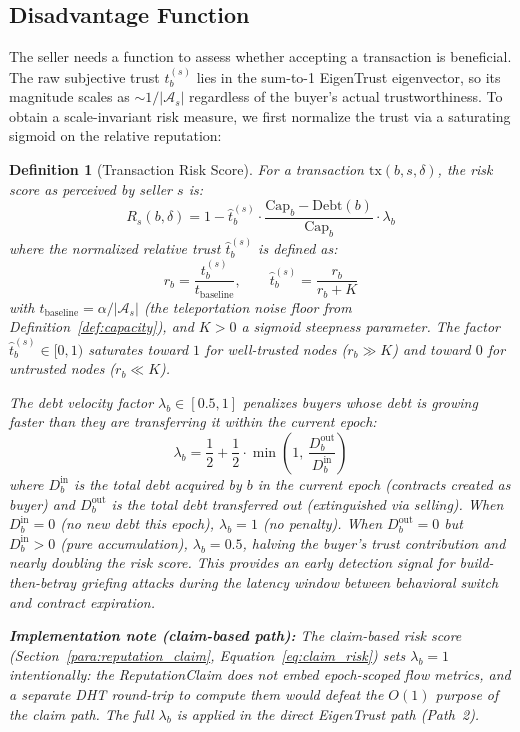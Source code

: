 \documentclass[11pt]{article}
\newtheorem{definition}[theorem]{Definition}
\begin{document}
\subsection{Disadvantage Function}

The seller needs a function to assess whether accepting a transaction is beneficial. The raw subjective trust $t^{(s)}_b$ lies in the sum-to-1 EigenTrust eigenvector, so its magnitude scales as $\sim 1/|\mathcal{A}_s|$ regardless of the buyer's actual trustworthiness. To obtain a scale-invariant risk measure, we first normalize the trust via a saturating sigmoid on the relative reputation:

\begin{definition}[Transaction Risk Score]\label{def:risk_score}
For a transaction $\text{tx}(b, s, \delta)$, the risk score as perceived by seller $s$ is:
\begin{equation}\label{eq:risk}
    R_s(b, \delta) = 1 - \hat{t}^{(s)}_b \cdot \frac{\text{Cap}_b - \text{Debt}(b)}{\text{Cap}_b} \cdot \lambda_b
\end{equation}
where the \emph{normalized relative trust} $\hat{t}^{(s)}_b$ is defined as:
\begin{equation}\label{eq:rel_trust}
    r_b = \frac{t^{(s)}_b}{t_{\text{baseline}}}, \qquad
    \hat{t}^{(s)}_b = \frac{r_b}{r_b + K}
\end{equation}
with $t_{\text{baseline}} = \alpha / |\mathcal{A}_s|$ (the teleportation noise floor from Definition~\ref{def:capacity}), and $K > 0$ a sigmoid steepness parameter. The factor $\hat{t}^{(s)}_b \in [0, 1)$ saturates toward $1$ for well-trusted nodes ($r_b \gg K$) and toward $0$ for untrusted nodes ($r_b \ll K$).

The \emph{debt velocity factor} $\lambda_b \in [0.5, 1]$ penalizes buyers whose debt is growing faster than they are transferring it within the current epoch:
\begin{equation}\label{eq:transfer_factor}
    \lambda_b = \frac{1}{2} + \frac{1}{2} \cdot \min\!\left(1,\, \frac{D^{\text{out}}_b}{D^{\text{in}}_b}\right)
\end{equation}
where $D^{\text{in}}_b$ is the total debt acquired by $b$ in the current epoch (contracts created as buyer) and $D^{\text{out}}_b$ is the total debt transferred out (extinguished via selling). When $D^{\text{in}}_b = 0$ (no new debt this epoch), $\lambda_b = 1$ (no penalty). When $D^{\text{out}}_b = 0$ but $D^{\text{in}}_b > 0$ (pure accumulation), $\lambda_b = 0.5$, halving the buyer's trust contribution and nearly doubling the risk score. This provides an early detection signal for build-then-betray griefing attacks during the latency window between behavioral switch and contract expiration.

\textbf{Implementation note (claim-based path):} The claim-based risk score (Section~\ref{para:reputation_claim}, Equation~\ref{eq:claim_risk}) sets $\lambda_b = 1$ intentionally: the ReputationClaim does not embed epoch-scoped flow metrics, and a separate DHT round-trip to compute them would defeat the $O(1)$ purpose of the claim path. The full $\lambda_b$ is applied in the direct EigenTrust path (Path~2).
\end{definition}
\end{document}
